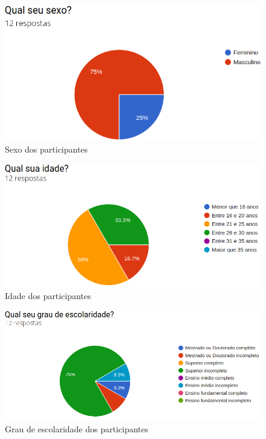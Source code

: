 \begin{figure}[!ht]
    \centering
    \includegraphics[scale=0.4]{./figuras/sexo.png}
    \caption{Sexo dos participantes}
    \label{fig:grafico-sexo}
\end{figure}

\begin{figure}[!ht]
    \centering
    \includegraphics[scale=0.4]{./figuras/idade.png}
    \caption{Idade dos participantes}
    \label{fig:grafico-idade}
\end{figure}

\begin{figure}[!ht]
    \centering
    \includegraphics[scale=0.4]{./figuras/grau_escolaridade.png}
    \caption{Grau de escolaridade dos participantes}
    \label{fig:grafico-grau}
\end{figure}

